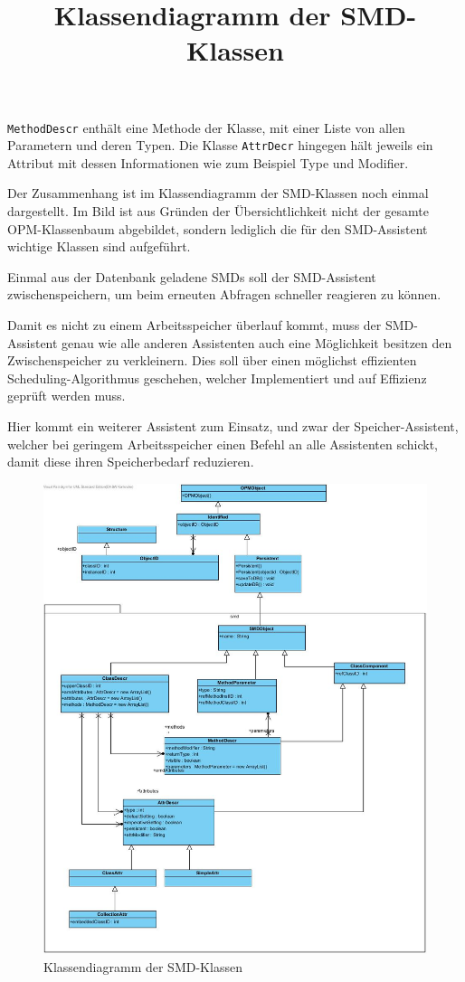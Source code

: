 \texttt{MethodDescr} enth\"alt eine Methode der Klasse, mit einer Liste von allen Parametern und deren Typen.
Die Klasse \texttt{AttrDecr} hingegen h\"alt jeweils ein Attribut mit dessen Informationen wie zum Beispiel Type und Modifier. \cite{Zil14}

Der Zusammenhang ist im Klassendiagramm der SMD-Klassen noch einmal dargestellt. Im Bild ist aus Gr\"unden der \"Ubersichtlichkeit nicht der gesamte OPM-Klassenbaum abgebildet, sondern lediglich die f\"ur den SMD-Assistent wichtige Klassen sind aufgef\"uhrt.

Einmal aus der Datenbank geladene \ac{SMD}s soll der SMD-Assistent zwischenspeichern, um beim erneuten Abfragen schneller reagieren zu k\"onnen. 

Damit es nicht zu einem Arbeitsspeicher \"uberlauf kommt, muss der SMD-Assistent genau wie alle anderen Assistenten auch eine M\"oglichkeit besitzen den Zwischenspeicher zu verkleinern. Dies soll \"uber einen m\"oglichst effizienten Scheduling-Algorithmus geschehen, welcher Implementiert und auf Effizienz gepr\"uft werden muss.

Hier kommt ein weiterer Assistent zum Einsatz, und zwar der Speicher-Assistent, welcher bei geringem Arbeitsspeicher einen Befehl an alle Assistenten schickt, damit diese ihren Speicherbedarf reduzieren.

\begin{figure}[!ht]
\centering
\includegraphics[width=13cm]{Bilder/SMD_Klassen}
\title{Klassendiagramm der SMD-Klassen}
\caption{Klassendiagramm der SMD-Klassen}
\centering
\end{figure}

